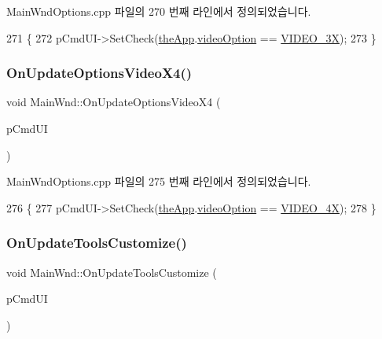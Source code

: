 Main\+Wnd\+Options.\+cpp 파일의 270 번째 라인에서 정의되었습니다.


\begin{DoxyCode}
271 \{
272   pCmdUI->SetCheck(\mbox{\hyperlink{_v_b_a_8cpp_a8095a9d06b37a7efe3723f3218ad8fb3}{theApp}}.\mbox{\hyperlink{class_v_b_a_a17dac073149c897f770c00ed7098ad32}{videoOption}} == \mbox{\hyperlink{_v_b_a_8h_a531c35e38ede3ea4e5ba5afb24b29493afa53ae70520cab28e97f53de9bf2eabd}{VIDEO\_3X}});
273 \}
\end{DoxyCode}
\mbox{\label{class_main_wnd_a3605271418d3f68bc60293ee699d6917}} 
\subsubsection{\texorpdfstring{On\+Update\+Options\+Video\+X4()}{OnUpdateOptionsVideoX4()}}
{\footnotesize\ttfamily void Main\+Wnd\+::\+On\+Update\+Options\+Video\+X4 (\begin{DoxyParamCaption}\item[{C\+Cmd\+UI $\ast$}]{p\+Cmd\+UI }\end{DoxyParamCaption})\hspace{0.3cm}{\ttfamily [protected]}}



Main\+Wnd\+Options.\+cpp 파일의 275 번째 라인에서 정의되었습니다.


\begin{DoxyCode}
276 \{
277   pCmdUI->SetCheck(\mbox{\hyperlink{_v_b_a_8cpp_a8095a9d06b37a7efe3723f3218ad8fb3}{theApp}}.\mbox{\hyperlink{class_v_b_a_a17dac073149c897f770c00ed7098ad32}{videoOption}} == \mbox{\hyperlink{_v_b_a_8h_a531c35e38ede3ea4e5ba5afb24b29493a6468bce6b84e6350d3de126f257eb38d}{VIDEO\_4X}});
278 \}
\end{DoxyCode}
\mbox{\label{class_main_wnd_a628bccba9f50a91d0c37e23c7cecaf8a}} 
\subsubsection{\texorpdfstring{On\+Update\+Tools\+Customize()}{OnUpdateToolsCustomize()}}
{\footnotesize\ttfamily void Main\+Wnd\+::\+On\+Update\+Tools\+Customize (\begin{DoxyParamCaption}\item[{C\+Cmd\+UI $\ast$}]{p\+Cmd\+UI }\end{DoxyParamCaption})\hspace{0.3cm}{\ttfamily [protected]}}



